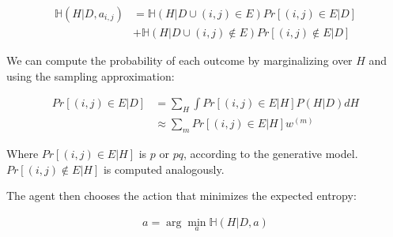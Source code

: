 \documentclass[11pt]{article}
\begin{document}
\begin{align}
    \mathbb{H}(H|D,a_{i,j}) &= \mathbb{H}(H|D \cup (i,j) \in E) Pr[(i,j) \in E | D]  \\
                            &+ \mathbb{H}(H|D \cup (i,j) \notin E) Pr[(i,j) \notin E | D]
\end{align}

We can compute the probability of each outcome by marginalizing over $H$ and using the sampling approximation:

\begin{align}
    Pr[(i,j) \in E | D] &=  \sum_H \int Pr[(i,j) \in E | H] P(H|D)  dH \\
                       &\approx \sum_m  Pr[(i,j) \in E | H] w^{(m)} 
\end{align}

Where $Pr[(i,j) \in E | H]$ is $p$ or $pq$, according to the generative model. $Pr[(i,j) \notin E | H]$ is computed analogously.

The agent then chooses the action that minimizes the expected entropy:

\begin{align}
    a = \arg \min_a \mathbb{H}(H|D,a)
\end{align}
\end{document}
